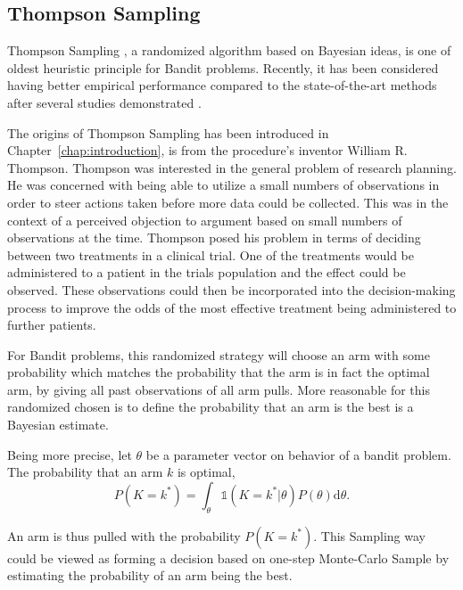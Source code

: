 \subsection{Thompson Sampling}
\label{subsec:thompson}

Thompson Sampling \cite{thompson1933likelihood}, a randomized algorithm based on Bayesian ideas, is one of oldest heuristic principle  for Bandit problems. Recently, it has been considered having better empirical performance compared to the state-of-the-art methods after several studies demonstrated \cite{chapelle2011empirical,agrawal2011analysis,agrawal2012thompson}.

The origins of Thompson Sampling has been introduced in Chapter~\ref{chap:introduction}, is from the procedure's inventor  William R. Thompson. Thompson was interested in the general problem of research planning. He was concerned with being able to utilize a small numbers of observations in order to steer actions taken before more data could be collected.
This was in the context of a perceived objection to argument based on small numbers of observations at the time. Thompson posed his problem in terms of deciding between two treatments in a clinical trial. One of the treatments would  be administered to a patient in the trials population and the effect could be observed. These observations could then be incorporated into the decision-making process to improve the odds of the most effective treatment being administered to further patients.

For Bandit problems, this randomized strategy will choose an arm with some probability which matches the probability that the arm is in fact the optimal arm, by giving all past observations of all arm pulls. More reasonable for this randomized chosen is to define the probability that an arm is the best is a Bayesian estimate. 

Being more precise, let $\theta$  be a parameter vector on behavior of a bandit problem. The probability that an arm $k$ is optimal, 
\begin{equation}
P(K=k^{\ast}) = \int_{\theta}\mathds{1}(K=k^{\ast}|\theta)P(\theta)\mathrm{d}\theta.
\end{equation}

An arm is thus pulled with the probability $P(K=k^{\ast})$. This Sampling way could be viewed as forming a decision based on one-step Monte-Carlo Sample by estimating the probability of an arm being the best.

